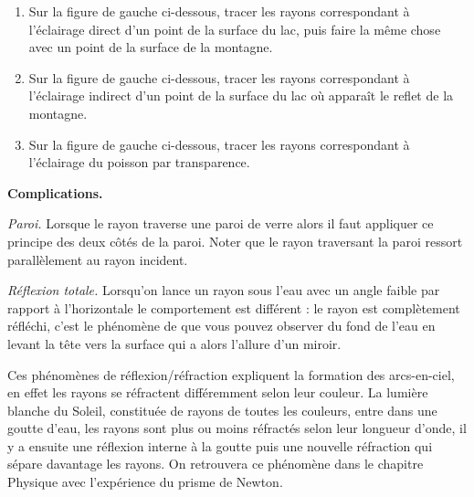 \documentclass[11pt,class=report,crop=false]{standalone}
\begin{document}
\begin{exercicecours}
\sauteligne
\begin{enumerate}
	\item Sur la figure de gauche ci-dessous, tracer les rayons correspondant à l'éclairage direct d'un point de la surface du lac, puis faire la même chose avec un point de la surface de la montagne.
	\item Sur la figure de gauche ci-dessous, tracer les rayons correspondant à l'éclairage indirect d'un point de la surface du lac où apparaît le reflet de la montagne.
	
	
	\item Sur la figure de gauche ci-dessous, tracer les rayons correspondant à l'éclairage du poisson par transparence.
	
	
\end{enumerate}
	
\end{exercicecours}


\medskip

\textbf{Complications.}

\emph{Paroi.} Lorsque le rayon traverse une paroi de verre alors il faut appliquer ce principe des deux côtés de la paroi. Noter que le rayon traversant la paroi ressort parallèlement au rayon incident.



\emph{Réflexion totale.} Lorsqu'on lance un rayon sous l'eau avec un angle faible par rapport à l'horizontale le comportement est différent : le rayon est complètement réfléchi, c'est le phénomène de  que vous pouvez observer du fond de l'eau en levant la tête vers la surface qui a alors l'allure d'un miroir.



Ces phénomènes de réflexion/réfraction expliquent la formation des arcs-en-ciel, en effet les rayons se réfractent différemment selon leur couleur. La lumière blanche du Soleil, constituée de rayons de toutes les couleurs, entre dans une goutte d'eau, les rayons sont plus ou moins réfractés selon leur longueur d'onde, il y a ensuite une réflexion interne à la goutte puis une nouvelle réfraction qui sépare davantage les rayons.
On retrouvera ce phénomène dans le chapitre \og{}Physique\fg{} avec l'expérience du prisme de Newton.
\end{document}
